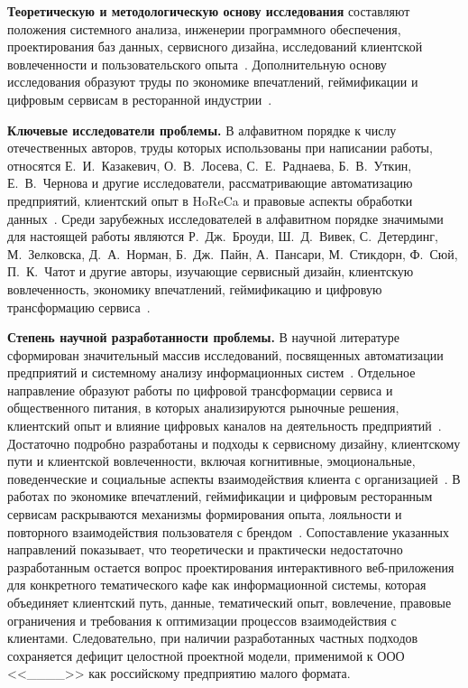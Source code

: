 \textbf{Теоретическую и методологическую основу исследования} составляют положения системного анализа, инженерии программного обеспечения, проектирования баз данных, сервисного дизайна, исследований клиентской вовлеченности и пользовательского опыта~\cite{utkin_baldin_2003, radnaeva2019, bobrovskiy2024, stickdorn2018, brodie2011, vivek2012, pansari2017, norman2013}. Дополнительную основу исследования образуют труды по экономике впечатлений, геймификации и цифровым сервисам в ресторанной индустрии~\cite{pine1998, deterding2011, xu2017, rita2022, londono2024, thomas2023}.

\textbf{Ключевые исследователи проблемы.} В алфавитном порядке к числу отечественных авторов, труды которых использованы при написании работы, относятся Е.~И.~Казакевич, О.~В.~Лосева, С.~Е.~Раднаева, Б.~В.~Уткин, Е.~В.~Чернова и другие исследователи, рассматривающие автоматизацию предприятий, клиентский опыт в HoReCa и правовые аспекты обработки данных~\cite{kazakevich2021, klientskiy_opyt_horeca, radnaeva2019, utkin_baldin_2003, chernova2022}. Среди зарубежных исследователей в алфавитном порядке значимыми для настоящей работы являются Р.~Дж.~Броуди, Ш.~Д.~Вивек, С.~Детердинг, М.~Зелковска, Д.~А.~Норман, Б.~Дж.~Пайн, А.~Пансари, М.~Стикдорн, Ф.~Сюй, П.~К.~Чатот и другие авторы, изучающие сервисный дизайн, клиентскую вовлеченность, экономику впечатлений, геймификацию и цифровую трансформацию сервиса~\cite{brodie2011, vivek2012, deterding2011, ziolkowska2021, norman2013, pine1998, pansari2017, stickdorn2018, xu2017, chathoth2016}.

\textbf{Степень научной разработанности проблемы.} В научной литературе сформирован значительный массив исследований, посвященных автоматизации предприятий и системному анализу информационных систем~\cite{utkin_baldin_2003, radnaeva2019, bobrovskiy2024}. Отдельное направление образуют работы по цифровой трансформации сервиса и общественного питания, в которых анализируются рыночные решения, клиентский опыт и влияние цифровых каналов на деятельность предприятий~\cite{chernova2022, ziolkowska2021, klientskiy_opyt_horeca}. Достаточно подробно разработаны и подходы к сервисному дизайну, клиентскому пути и клиентской вовлеченности, включая когнитивные, эмоциональные, поведенческие и социальные аспекты взаимодействия клиента с организацией~\cite{stickdorn2018, brodie2011, vivek2012, pansari2017, behnam2021}. В работах по экономике впечатлений, геймификации и цифровым ресторанным сервисам раскрываются механизмы формирования опыта, лояльности и повторного взаимодействия пользователя с брендом~\cite{pine1998, deterding2011, xu2017, rita2022, londono2024, thomas2023}. Сопоставление указанных направлений показывает, что теоретически и практически недостаточно разработанным остается вопрос проектирования интерактивного веб-приложения для конкретного тематического кафе как информационной системы, которая объединяет клиентский путь, данные, тематический опыт, вовлечение, правовые ограничения и требования к оптимизации процессов взаимодействия с клиентами. Следовательно, при наличии разработанных частных подходов сохраняется дефицит целостной проектной модели, применимой к ООО <<\_\_\_\_>> как российскому предприятию малого формата.

